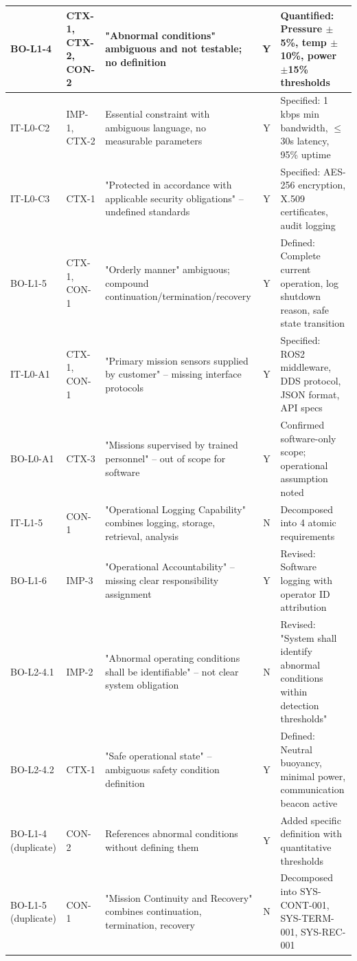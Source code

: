 \documentclass[12pt,a4paper]{article}
\begin{document}
\begin{longtable}{|>{\raggedright\arraybackslash}p{}|>{\raggedright\arraybackslash}p{}|>{\raggedright\arraybackslash}p{}|c|>{\raggedright\arraybackslash}p{}|}
BO-L1-4 & CTX-1, CTX-2, CON-2 & "Abnormal conditions" ambiguous and not testable; no definition & Y & Quantified: Pressure $\pm$5\%, temp $\pm$10\%, power $\pm$15\% thresholds \\
\hline
IT-L0-C2 & IMP-1, CTX-2 & Essential constraint with ambiguous language, no measurable parameters & Y & Specified: 1 kbps min bandwidth, $\leq$30s latency, 95\% uptime \\
\hline
IT-L0-C3 & CTX-1 & "Protected in accordance with applicable security obligations" – undefined standards & Y & Specified: AES-256 encryption, X.509 certificates, audit logging \\
\hline
BO-L1-5 & CTX-1, CON-1 & "Orderly manner" ambiguous; compound continuation/termination/recovery & Y & Defined: Complete current operation, log shutdown reason, safe state transition \\
\hline
IT-L0-A1 & CTX-1, CON-1 & "Primary mission sensors supplied by customer" – missing interface protocols & Y & Specified: ROS2 middleware, DDS protocol, JSON format, API specs \\
\hline
BO-L0-A1 & CTX-3 & "Missions supervised by trained personnel" – out of scope for software & Y & Confirmed software-only scope; operational assumption noted \\
\hline
IT-L1-5 & CON-1 & "Operational Logging Capability" combines logging, storage, retrieval, analysis & N & Decomposed into 4 atomic requirements \\
\hline
BO-L1-6 & IMP-3 & "Operational Accountability" – missing clear responsibility assignment & Y & Revised: Software logging with operator ID attribution \\
\hline
BO-L2-4.1 & IMP-2 & "Abnormal operating conditions shall be identifiable" – not clear system obligation & N & Revised: "System shall identify abnormal conditions within detection thresholds" \\
\hline
BO-L2-4.2 & CTX-1 & "Safe operational state" – ambiguous safety condition definition & Y & Defined: Neutral buoyancy, minimal power, communication beacon active \\
\hline
BO-L1-4 (duplicate) & CON-2 & References abnormal conditions without defining them & Y & Added specific definition with quantitative thresholds \\
\hline
BO-L1-5 (duplicate) & CON-1 & "Mission Continuity and Recovery" combines continuation, termination, recovery & N & Decomposed into SYS-CONT-001, SYS-TERM-001, SYS-REC-001 \\
\hline
\end{longtable}
\end{document}
